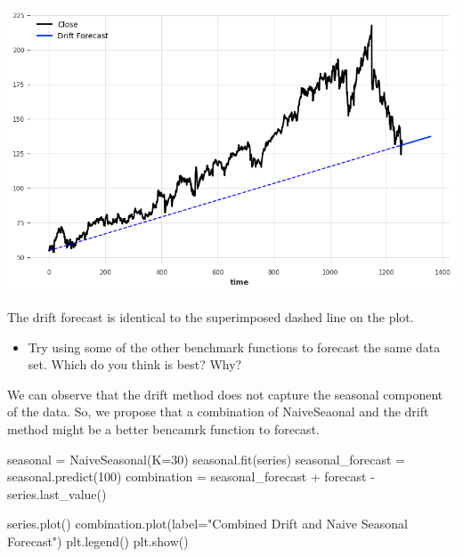 \documentclass[
  11pt,
]{article}
\newenvironment{Shaded}{\begin{snugshade}}{\end{snugshade}}
\newcommand{\DecValTok}[1]{\textcolor[rgb]{0.68,0.00,0.00}{#1}}
\newcommand{\NormalTok}[1]{\textcolor[rgb]{0.00,0.23,0.31}{#1}}
\newcommand{\OperatorTok}[1]{\textcolor[rgb]{0.37,0.37,0.37}{#1}}
\newcommand{\StringTok}[1]{\textcolor[rgb]{0.13,0.47,0.30}{#1}}
\providecommand{\tightlist}{%
  \setlength{\itemsep}{0pt}\setlength{\parskip}{0pt}}\usepackage{longtable,booktabs,array}
\begin{document}
\includegraphics{hw3_files/figure-pdf/cell-31-output-1.png}

The drift forecast is identical to the superimposed dashed line on the
plot.

\begin{itemize}
\tightlist
\item
  Try using some of the other benchmark functions to forecast the same
  data set. Which do you think is best? Why?
\end{itemize}

We can observe that the drift method does not capture the seasonal
component of the data. So, we propose that a combination of NaiveSeaonal
and the drift method might be a better bencamrk function to forecast.

\begin{Shaded}
\begin{Highlighting}[]
\NormalTok{seasonal }\OperatorTok{=}\NormalTok{ NaiveSeasonal(K}\OperatorTok{=}\DecValTok{30}\NormalTok{)}
\NormalTok{seasonal.fit(series)}
\NormalTok{seasonal\_forecast }\OperatorTok{=}\NormalTok{ seasonal.predict(}\DecValTok{100}\NormalTok{)}
\NormalTok{combination }\OperatorTok{=}\NormalTok{ seasonal\_forecast }\OperatorTok{+}\NormalTok{ forecast }\OperatorTok{{-}}\NormalTok{ series.last\_value()}

\NormalTok{series.plot()}
\NormalTok{combination.plot(label}\OperatorTok{=}\StringTok{"Combined Drift and Naive Seasonal Forecast"}\NormalTok{)}
\NormalTok{plt.legend()}
\NormalTok{plt.show()}
\end{Highlighting}
\end{Shaded}
\end{document}
